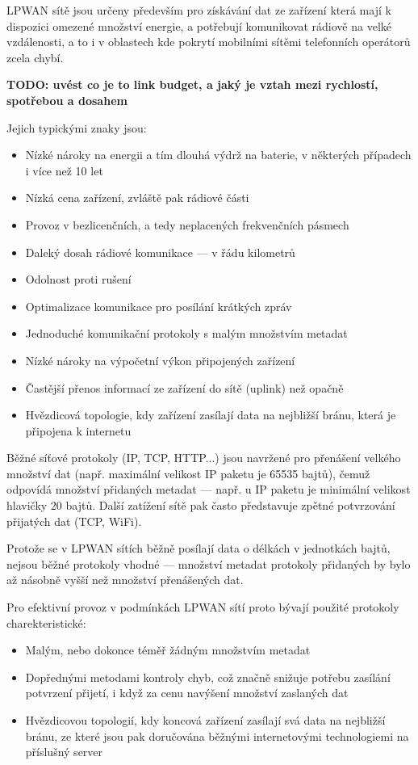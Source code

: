 
LPWAN sítě jsou určeny především pro získávání dat ze zařízení která mají k dispozici omezené množství energie, a potřebují komunikovat rádiově na velké vzdálenosti, a to i v oblastech kde pokrytí mobilními sítěmi telefonních operátorů zcela chybí.

\textbf{TODO: uvést co je to link budget, a jaký je vztah mezi rychlostí, spotřebou a dosahem}

Jejich typickými znaky jsou:

\begin{itemize}
    \item Nízké nároky na energii a tím dlouhá výdrž na baterie, v některých případech i více než 10 let
    \item Nízká cena zařízení, zvláště pak rádiové části
    \item Provoz v bezlicenčních, a tedy neplacených frekvenčních pásmech
    \item Daleký dosah rádiové  komunikace --- v řádu kilometrů
    \item Odolnost proti rušení
    \item Optimalizace komunikace pro posílání krátkých zpráv
    \item Jednoduché komunikační protokoly s malým množstvím metadat
    \item Nízké nároky na výpočetní výkon připojených zařízení
    \item Častější přenos informací ze zařízení do sítě (uplink) než opačně
    \item Hvězdicová topologie, kdy zařízení zasílají data na nejbližší bránu, která je připojena k internetu
\end{itemize}

Běžné síťové protokoly (IP, TCP, HTTP...) jsou navržené pro přenášení velkého 
množství dat (např. maximální velikost IP paketu je 65535 bajtů), čemuž odpovídá
množství přidaných metadat --- např. u IP paketu je minimální velikost hlavičky
20 bajtů. Další zatížení sítě pak často představuje zpětné potvrzování přijatých
dat (TCP, WiFi).

Protože se v LPWAN sítích běžně posílají data o délkách v jednotkách bajtů,
nejsou běžné protokoly vhodné --- množství metadat protokoly přidaných by 
bylo až násobně vyšší než množství přenášených dat.

Pro efektivní provoz v podmínkách LPWAN sítí proto bývají použité protokoly
charekteristické:

\begin{itemize}
    \item Malým, nebo dokonce téměř žádným množstvím metadat
    \item Dopřednými metodami kontroly chyb, což značně snižuje potřebu zasílání
        potvrzení přijetí, i když za cenu navýšení množství zaslaných dat
    \item Hvězdicovou topologií, kdy koncová zařízení zasílají svá data na 
        nejbližší bránu, ze které jsou pak doručována běžnými internetovými
        technologiemi na příslušný server
\end{itemize}

